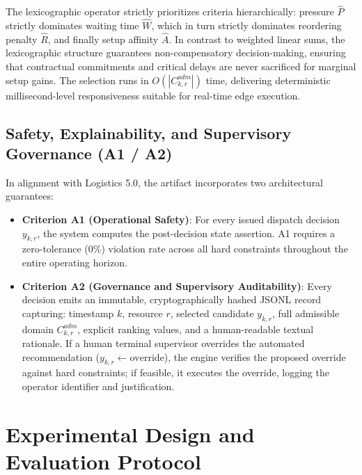 \documentclass[12pt,a4paper]{article}
\begin{document}
The lexicographic operator strictly prioritizes criteria hierarchically: pressure $\hat{P}$ strictly dominates waiting time $\hat{W}$, which in turn strictly dominates reordering penalty $\hat{R}$, and finally setup affinity $\hat{A}$. In contrast to weighted linear sums, the lexicographic structure guarantees non-compensatory decision-making, ensuring that contractual commitments and critical delays are never sacrificed for marginal setup gains. The selection runs in $O(|C^{adm}_{k,r}|)$ time, delivering deterministic millisecond-level responsiveness suitable for real-time edge execution.

\subsection{Safety, Explainability, and Supervisory Governance (A1 / A2)}
In alignment with Logistics 5.0, the artifact incorporates two architectural guarantees:
\begin{itemize}[leftmargin=1.2cm,itemsep=0pt,topsep=2pt]
  \item \textbf{Criterion A1 (Operational Safety)}: For every issued dispatch decision $y_{k,r}$, the system computes the post-decision state assertion. A1 requires a zero-tolerance ($0\%$) violation rate across all hard constraints throughout the entire operating horizon.
  \item \textbf{Criterion A2 (Governance and Supervisory Auditability)}: Every decision emits an immutable, cryptographically hashed JSONL record capturing: timestamp $k$, resource $r$, selected candidate $y_{k,r}$, full admissible domain $C^{adm}_{k,r}$, explicit ranking values, and a human-readable textual rationale. If a human terminal supervisor overrides the automated recommendation ($y_{k,r} \leftarrow \text{override}$), the engine verifies the proposed override against hard constraints; if feasible, it executes the override, logging the operator identifier and justification.
\end{itemize}

\section{Experimental Design and Evaluation Protocol}
\label{sec:protocol}
\end{document}
